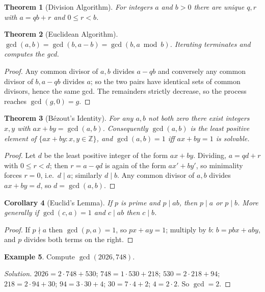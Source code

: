 \documentclass[11pt]{article}
\theoremstyle{plain}
\newtheorem{theorem}{Theorem}[section]
\newtheorem{corollary}[theorem]{Corollary}
\theoremstyle{definition}
\newtheorem{example}[theorem]{Example}
\newenvironment{solution}{\begin{proof}[Solution]}{\end{proof}}
\newcommand{\ZZ}{\mathbb{Z}}
\begin{document}
\begin{theorem}[Division Algorithm]
For integers $a$ and $b > 0$ there are unique $q, r$ with $a = qb + r$ and
$0 \le r < b$.
\end{theorem}

\begin{theorem}[Euclidean Algorithm]
$\gcd(a, b) = \gcd(b, a - b) = \gcd(b, a \bmod b)$. Iterating terminates and
computes the gcd.
\end{theorem}
\begin{proof}
Any common divisor of $a, b$ divides $a - qb$ and conversely any common
divisor of $b, a-qb$ divides $a$; so the two pairs have identical sets of
common divisors, hence the same gcd. The remainders strictly decrease, so the
process reaches $\gcd(g, 0) = g$.
\end{proof}

\begin{theorem}[Bézout's Identity]
For any $a, b$ not both zero there exist integers $x, y$ with
$ax + by = \gcd(a,b)$. Consequently $\gcd(a,b)$ is the least positive element
of $\{ax+by : x,y \in \ZZ\}$, and $\gcd(a,b)=1$ iff $ax+by=1$ is solvable.
\end{theorem}
\begin{proof}
Let $d$ be the least positive integer of the form $ax + by$. Dividing,
$a = qd + r$ with $0 \le r < d$; then $r = a - qd$ is again of the form
$ax'+by'$, so minimality forces $r = 0$, i.e.\ $d \mid a$; similarly
$d \mid b$. Any common divisor of $a, b$ divides $ax+by = d$, so
$d = \gcd(a,b)$.
\end{proof}

\begin{corollary}[Euclid's Lemma]
If $p$ is prime and $p \mid ab$, then $p \mid a$ or $p \mid b$. More generally
if $\gcd(c, a) = 1$ and $c \mid ab$ then $c \mid b$.
\end{corollary}
\begin{proof}
If $p \nmid a$ then $\gcd(p,a)=1$, so $px + ay = 1$; multiply by $b$:
$b = pbx + aby$, and $p$ divides both terms on the right.
\end{proof}

\begin{example}
Compute $\gcd(2026, 748)$.
\end{example}
\begin{solution}
$2026 = 2\cdot748 + 530$; $748 = 1\cdot530 + 218$; $530 = 2\cdot218 + 94$;
$218 = 2\cdot 94 + 30$; $94 = 3\cdot30 + 4$; $30 = 7\cdot4+2$; $4 = 2\cdot2$.
So $\gcd = 2$.
\end{solution}
\end{document}
